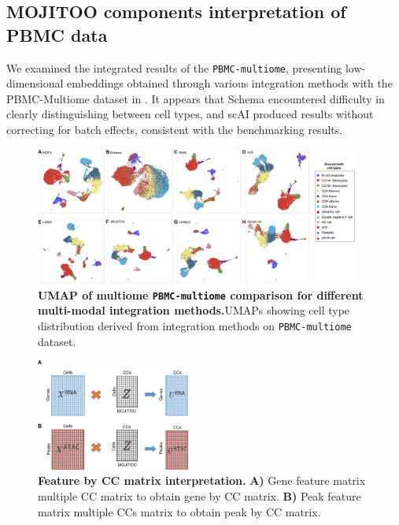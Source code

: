 \subsection{MOJITOO components interpretation of PBMC data}
\label{MOJITOO:out:pbmc}
We examined the integrated results of the \texttt{PBMC-multiome}, presenting low-dimensional embeddings obtained through various integration methods with the PBMC-Multiome dataset in . It appears that Schema encountered difficulty in clearly distinguishing between cell types, and scAI produced results without correcting for batch effects, consistent with the benchmarking results.
\begin{figure}[!ht]
	\centering
	\includegraphics[width=0.95\textwidth]{pbmc_multiome_umap/fig}
	\vspace{0.1cm}
	\caption[UMAP of multiome PBMC comparison for different multi-modal integration methods.]{\textbf{UMAP of multiome \texttt{PBMC-multiome} comparison for different multi-modal integration methods.}UMAPs showing cell type distribution derived from integration methods on \texttt{PBMC-multiome} dataset. }
	\label{fig:pbmc_multiome_umap}
\end{figure}


\begin{figure}[!h]
	\centering
	\includegraphics[width=0.45\textwidth]{Zfeature/fig}
	\vspace{0.1cm}
	\caption[Feature by CC matrix interpretation.]{\textbf{Feature by CC matrix interpretation.} \textbf{A)} Gene feature matrix multiple CC matrix to obtain gene by CC matrix. \textbf{B)} Peak feature matrix multiple CCs matrix to obtain peak by CC matrix.}
	\label{fig:Zfeature}
\end{figure}

